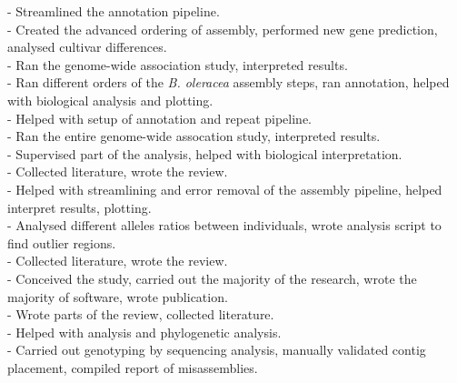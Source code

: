 \documentclass[]{friggeri-cv} %
\begin{document}
\cite{montenegro2017pangenome}
- Streamlined the annotation pipeline.\\

\cite{kaur2017advanced}
- Created the advanced ordering of assembly, performed new gene prediction, analysed cultivar differences.\\

\cite{gacek2016genome}
- Ran the genome-wide association study, interpreted results.\\

\cite{golicz2016pangenome}
- Ran different orders of the \textit{B. oleracea} assembly steps, ran annotation, helped with biological analysis and plotting.\\

\cite{hane2017comprehensive}
- Helped with setup of annotation and repeat pipeline.\\

\cite{barash2016candidate}
- Ran the entire genome-wide assocation study, interpreted results.\\

\cite{lee2016genome}
- Supervised part of the analysis, helped with biological interpretation.\\

\cite{bayer2016genomics}
- Collected literature, wrote the review.\\

\cite{visendi2016efficient}
- Helped with streamlining and error removal of the assembly pipeline, helped interpret results, plotting.\\

\cite{mason2016centromere}
- Analysed different alleles ratios between individuals, wrote analysis script to find outlier regions.\\

\cite{bayer2016skim}
- Collected literature, wrote the review.\\

\cite{bayer2015high}
- Conceived the study, carried out the majority of the research, wrote the majority of software, wrote publication.\\
 
\cite{golicz2015skim}
- Wrote parts of the review, collected literature.\\

\cite{lai2015identification}
- Helped with analysis and phylogenetic analysis.\\

\cite{chalhoub2014early}
- Carried out genotyping by sequencing analysis, manually validated contig placement, compiled report of misassemblies.\\
\end{document}

